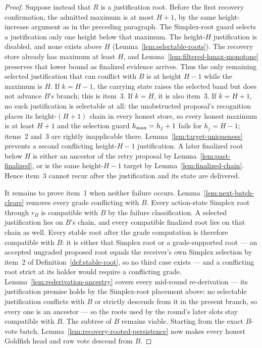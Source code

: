 \begin{proof}
Suppose instead that \(R\) is a justification root.  Before the first
recovery confirmation, the admitted maximum is at most \(H+1\), by the same
height-increase argument as in the preceding paragraph.  The Simplex-root
guard selects a justification only one height below that maximum.
The height-\(H\) justification is disabled, and none exists above
\(H\) (Lemma~\ref{lem:selectable-roots}).  The recovery store already has
maximum at least \(H\), and
Lemma~\ref{lem:filtered-hmax-monotone} preserves that lower bound as finalized
evidence arrives.  Thus the only remaining selected justification that can
conflict with \(B\) is at height \(H-1\) while the maximum is \(H\).  If
\(k=H-1\), the carrying state raises the selected band but does not advance
\(B\)'s branch; this is item~3.  If \(k=H\), it is also item~3.  If
\(k=H+1\), no such justification is selectable at all: the unobstructed
proposal's recognition places its height-\((H{+}1)\) chain in every
honest store, so every honest maximum is at least \(H+1\) and the
selection guard \(h_{\max}=h_j+1\) fails for \(h_j=H-1\); items~2 and~3
are rightly inapplicable there.
Lemma~\ref{lem:target-uniqueness} prevents a second conflicting
height-\(H-1\) justification.  A later finalized root below \(H\) is either
an ancestor of the retry proposal by Lemma~\ref{lem:past-finalized}, or is
the same height-\(H-1\) target by
Lemma~\ref{lem:finalized-chain}.  Hence item~3 cannot recur after the
justification and its state are delivered.

It remains to prove item~1 when neither failure occurs.
Lemma~\ref{lem:next-batch-clears} removes every grade conflicting with \(B\).
Every action-state Simplex root through \(r_B\) is compatible with \(B\) by
the failure classification.  A selected justification lies on \(B\)'s chain,
and every compatible finalized root lies on that chain as well.  Every stable root after the grade computation
is therefore compatible with \(B\): it is either that Simplex root or a
grade-supported root --- an accepted ungraded proposed root equals the
receiver's own Simplex selection by item~2 of
Definition~\ref{def:stable-root}, so no third case exists --- and a
conflicting root strict at its holder would require a
conflicting grade.  Lemma~\ref{lem:rederivation-ancestry} covers every mid-round
re-derivation --- its justification premise holds by the Simplex-root
placement above: no selectable justification conflicts with \(B\) or
strictly descends from it in the present branch, so every one is an
ancestor --- so the roots used by the
round's later slots stay compatible with \(B\).  The subtree of \(B\) remains viable.  Starting from the
exact \(B\)-vote batch, Lemma~\ref{lem:recovery-rooted-persistence} now makes
every honest Goldfish head and raw vote descend from \(B\).


\end{proof}
